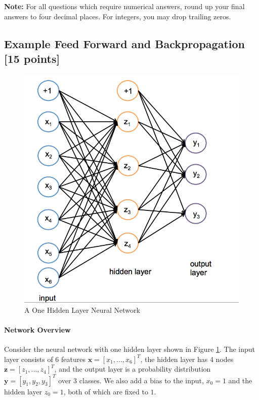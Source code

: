 \documentclass[11pt]{article}
\numberwithin{equation}{section} %
\numberwithin{figure}{section} %
\numberwithin{table}{section} %
\newcommand{\xv}{\mathbf{x}}
\newcommand{\yv}{\mathbf{y}}
\newcommand{\zv}{\mathbf{z}}
\newcommand{\points}[1]{{\bf [#1 points]}}
\begin{document}
\textbf{Note:} For all questions which require numerical answers, round up your final answers to four decimal places. For integers, you may drop trailing zeros.

\subsection{Example Feed Forward and Backpropagation \points{15}}
\label{sec:onelayertoy}

 \begin{figure}[h]
        \centering
        \includegraphics[scale=0.8]{oneHL6.png}
        \caption{A One Hidden Layer Neural Network}
        \label{fig:oneHL}
    \end{figure}

\paragraph{Network Overview}
Consider the neural network with one hidden layer shown in Figure \ref{fig:oneHL}. The input layer consists of 6 features $\xv = [x_1,...,x_6]^T$, the hidden layer has 4  nodes $\zv = [z_1,...,z_4]^T$, and the output layer is a probability distribution $\yv = [y_1, y_2, y_3]^T$ over 3 classes. We also add a bias to the input, $x_0 = 1$ and the hidden layer $z_0 = 1$, both of which are fixed to $1$.
\end{document}
